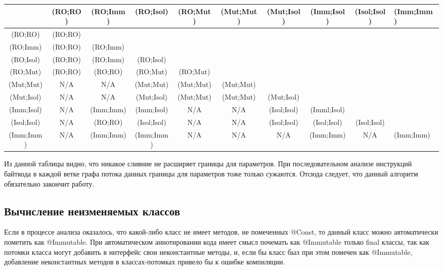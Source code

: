 {\tiny

	\begin{tabular}{ c | c | c | c | c | c | c | c | c }
	\hline			  &(RO;RO)&(RO;Imm) &(RO;Isol)  &(RO;Mut) &(Mut;Mut) &(Mut;Isol) &(Imm;Isol) &(Isol;Isol) &(Imm;Imm)\\
	\hline(RO;RO)    &(RO;RO)&          &		    &          &           &            &            &             &          \\
	\hline(RO;Imm)   &(RO;RO)&(RO;Imm) &            &          &           &            &            &             &          \\
	\hline(RO;Isol)  &(RO;RO)&(RO;Imm) &(RO;Isol)  &          &           &            &            &             &          \\
	\hline(RO;Mut)   &(RO;RO)&(RO;RO)  &(RO;Mut)   &(RO;Mut) &           &            &            &             &          \\
	\hline(Mut;Mut)  &N/A     &N/A       &(Mut;Mut)  &(Mut;Mut)&(Mut;Mut) &            &            &             &          \\
	\hline(Mut;Isol) &N/A     &N/A       &(Mut;Isol) &(Mut;Mut)&(Mut;Mut) &(Mut;Isol) &            &             &          \\
	\hline(Imm;Isol) &N/A     &(Imm;Imm)&(Imm;Isol) &N/A       &N/A        &(Isol;Isol)&(Imml;Isol)&             &          \\
	\hline(Isol;Isol)&N/A     &(RO;RO)  &(Isol;Isol)&N/A       &N/A        &(Isol;Isol)&(Isol;Isol)&(Isol;Isol) &          \\
	\hline(Imm;Imm)  &N/A     &(Imm;Imm)&(Imm;Imm)  &N/A       &N/A        &N/A         &(Imm;Imm)  &N/A          &(Imm;Imm)\\    
    \end{tabular}

}
Из данной таблицы видно, что никакое слияние не расширяет границы для параметров. При последовательном анализе инструкций байткода в каждой ветке графа потока данных границы для параметров тоже только сужаются. Отсюда следует, что данный алгоритм обязательно закончит работу.

\subsection{Вычисление неизменяемых классов}

Если в процессе анализа оказалось, что какой-либо класс не имеет методов, не помеченных @Const, то данный класс можно автоматически пометить как @Immutable. При автоматическом аннотировании кода имеет смысл почемать как @Immutable только final классы, так как потомки класса могут добавить в интерфейс свои неконстантные методы, и, если бы класс был при этом помечен как @Immutable, добавление неконстантных методов в классах-потомках привело бы к ошибке компиляции.


